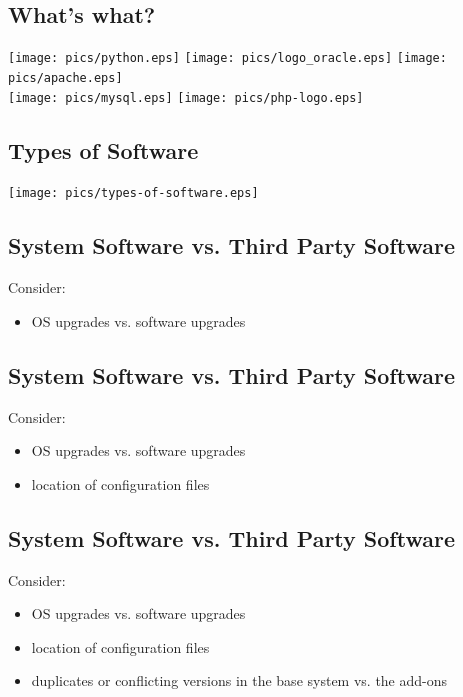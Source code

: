 \documentclass[xga]{xdvislides}
\begin{document}
\subsection{What's what?}
\begin{center}
	\texttt{[image: pics/python.eps]}
	\texttt{[image: pics/logo\_oracle.eps]}
	\texttt{[image: pics/apache.eps]} \\
	\texttt{[image: pics/mysql.eps]}
	\texttt{[image: pics/php-logo.eps]}
\end{center}

\subsection{Types of Software}
\vfill
\begin{center}
	\texttt{[image: pics/types-of-software.eps]}
\end{center}
\vfill




\subsection{System Software vs. Third Party Software}
Consider:
\begin{itemize}
	\item OS upgrades vs. software upgrades
\end{itemize}

\subsection{System Software vs. Third Party Software}
Consider:
\begin{itemize}
	\item OS upgrades vs. software upgrades
	\item location of configuration files
\end{itemize}

\subsection{System Software vs. Third Party Software}
Consider:
\begin{itemize}
	\item OS upgrades vs. software upgrades
	\item location of configuration files
	\item duplicates or conflicting versions in the base system vs. the
		add-ons
\end{itemize}
\end{document}

